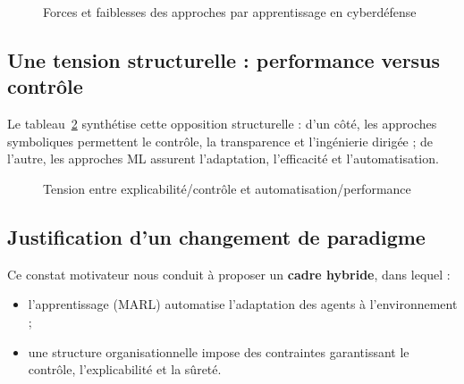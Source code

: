 \documentclass[ twoside,openright,titlepage,numbers=noenddot,headinclude,%
                footinclude=true,cleardoublepage=empty,abstractoff, %
                BCOR=5mm,paper=a4,fontsize=11pt,%
                french,american,%
                ]{scrreprt}
\begin{document}
\begin{figure}[H]
    \centering
    \caption{Forces et faiblesses des approches par apprentissage en cyberdéfense}
    \label{fig:limits_learning}
\end{figure}

\subsection{Une tension structurelle : performance versus contrôle}

Le tableau~\ref{fig:limits_tradeoff} synthétise cette opposition structurelle : d'un côté, les approches symboliques permettent le contrôle, la transparence et l'ingénierie dirigée ; de l'autre, les approches ML assurent l'adaptation, l'efficacité et l'automatisation.

\begin{figure}[H]
    \centering
    \caption{Tension entre explicabilité/contrôle et automatisation/performance}
    \label{fig:limits_tradeoff}
\end{figure}

\subsection{Justification d'un changement de paradigme}

Ce constat motivateur nous conduit à proposer un \textbf{cadre hybride}, dans lequel :
\begin{itemize}
    \item l'apprentissage (MARL) automatise l'adaptation des agents à l'environnement ;
    \item une structure organisationnelle impose des contraintes garantissant le contrôle, l'explicabilité et la sûreté.
\end{itemize}
\end{document}
